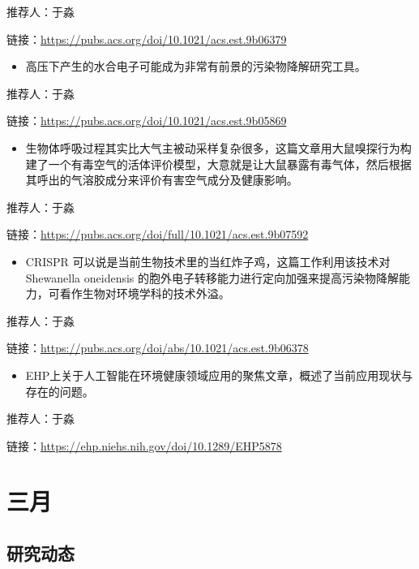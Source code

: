 \documentclass[
]{book}
\providecommand{\tightlist}{%
  \setlength{\itemsep}{0pt}\setlength{\parskip}{0pt}}
\begin{document}
推荐人：于淼

链接：\url{https://pubs.acs.org/doi/10.1021/acs.est.9b06379}

\begin{itemize}
\tightlist
\item
  高压下产生的水合电子可能成为非常有前景的污染物降解研究工具。
\end{itemize}

推荐人：于淼

链接：\url{https://pubs.acs.org/doi/10.1021/acs.est.9b05869}

\begin{itemize}
\tightlist
\item
  生物体呼吸过程其实比大气主被动采样复杂很多，这篇文章用大鼠嗅探行为构建了一个有毒空气的活体评价模型，大意就是让大鼠暴露有毒气体，然后根据其呼出的气溶胶成分来评价有害空气成分及健康影响。
\end{itemize}

推荐人：于淼

链接：\url{https://pubs.acs.org/doi/full/10.1021/acs.est.9b07592}

\begin{itemize}
\tightlist
\item
  CRISPR 可以说是当前生物技术里的当红炸子鸡，这篇工作利用该技术对 Shewanella oneidensis 的胞外电子转移能力进行定向加强来提高污染物降解能力，可看作生物对环境学科的技术外溢。
\end{itemize}

推荐人：于淼

链接：\url{https://pubs.acs.org/doi/abs/10.1021/acs.est.9b06378}

\begin{itemize}
\tightlist
\item
  EHP上关于人工智能在环境健康领域应用的聚焦文章，概述了当前应用现状与存在的问题。
\end{itemize}

推荐人：于淼

链接：\url{https://ehp.niehs.nih.gov/doi/10.1289/EHP5878}

\hypertarget{ux4e09ux6708-2}{%
\section*{三月}\label{ux4e09ux6708-2}}

\hypertarget{ux7814ux7a76ux52a8ux6001-28}{%
\subsection*{研究动态}\label{ux7814ux7a76ux52a8ux6001-28}}
\end{document}
